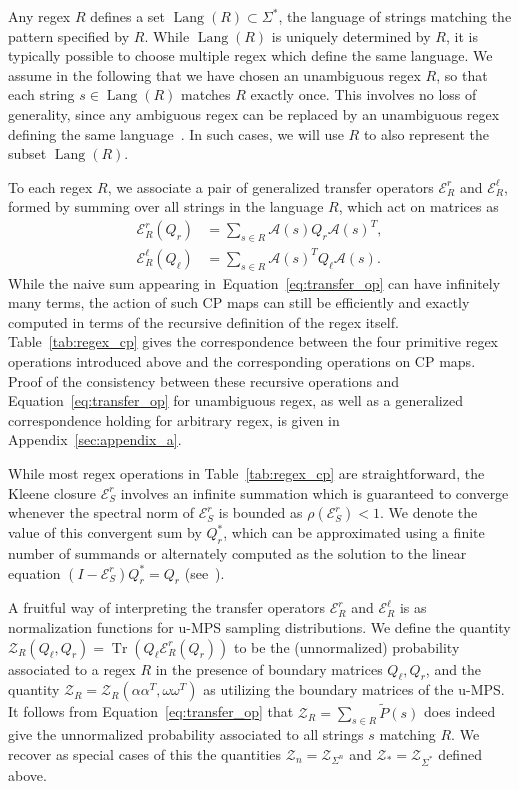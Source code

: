 \documentclass[twoside]{article}
\newcommand{\eqnref}[1]{Equation~\ref{#1}}
\DeclareMathOperator{\Tr}{Tr}
\DeclareMathOperator{\Lang}{Lang}
\newcommand{\Z}{\mc{Z}}
\newcommand{\EL}{\mc{E}^{\scriptstyle \ell}}
\newcommand{\ER}{\mc{E}^{\scriptstyle r}}
\newcommand{\QL}{Q_{\ell}}
\newcommand{\QR}{Q_{r}}
\newcommand{\Pt}{\tilde{P}}
\newcommand{\alphamat}{\alpha\alpha^T}
\newcommand{\omegamat}{\omega\omega^T}
\newcommand{\mc}[1]{\mathcal{#1}}
\begin{document}
Any regex $R$ defines a set $\Lang(R) \subset \Sigma^*$, the language of strings matching the pattern specified by $R$. While $\Lang(R)$ is uniquely determined by $R$, it is typically possible to choose multiple regex which define the same language. We assume in the following that we have chosen an unambiguous regex $R$, so that each string $s \in \Lang(R)$ matches $R$ exactly once. This involves no loss of generality, since any ambiguous regex can be replaced by an unambiguous regex defining the same language~\citep{book1971}. In such cases, we will use $R$ to also represent the subset $\Lang(R)$.

To each regex $R$, we associate a pair of generalized transfer operators $\ER_{R}$ and $\EL_{R}$, formed by summing over all strings in the language $R$, which act on matrices as
%
\begin{align}
\label{eq:transfer_op}
\ER_R(\QR) &= \sum_{s\in R} \mc{A}(s) \QR \mc{A}(s)^T, \nonumber\\ 
\EL_R(\QL) &= \sum_{s\in R} \mc{A}(s)^T \QL \mc{A}(s).
\end{align}
%
While the naive sum appearing in~\eqnref{eq:transfer_op} can have infinitely many terms, the action of such CP maps can still be efficiently and exactly computed in terms of the recursive definition of the regex itself. Table~\ref{tab:regex_cp} gives the correspondence between the four primitive regex operations introduced above and the corresponding operations on CP maps. Proof of the consistency between these recursive operations and \eqnref{eq:transfer_op} for unambiguous regex, as well as a generalized correspondence holding for arbitrary regex, is given in Appendix~\ref{sec:appendix_a}.

While most regex operations in Table~\ref{tab:regex_cp} are straightforward, the Kleene closure $\ER_S$ involves an infinite summation which is guaranteed to converge whenever the spectral norm of $\ER_S$ is bounded as $\rho(\ER_S) < 1$. We denote the value of this convergent sum by $\QR^*$, which can be approximated using a finite number of summands or alternately computed as the solution to the linear equation $(I - \ER_S)\QR^* = \QR$ (see~\citep{balle2019}).

A fruitful way of interpreting the transfer operators $\ER_R$ and $\EL_R$ is as normalization functions for u-MPS sampling distributions. We define the quantity $\Z_R(\QL, \QR) = \Tr(\QL \ER_R(\QR))$ to be the (unnormalized) probability associated to a regex $R$ in the presence of boundary matrices $\QL, \QR$, and the quantity $\Z_R = \Z_R(\alphamat, \omegamat)$ as utilizing the boundary matrices of the u-MPS. It follows from \eqnref{eq:transfer_op} that $\Z_R = \sum_{s \in R}\Pt(s)$ does indeed give the unnormalized probability associated to all strings $s$ matching $R$. We recover as special cases of this the quantities $\Z_n = \Z_{\Sigma^n}$ and $\Z_* = \Z_{\Sigma^*}$ defined above.
\end{document}
